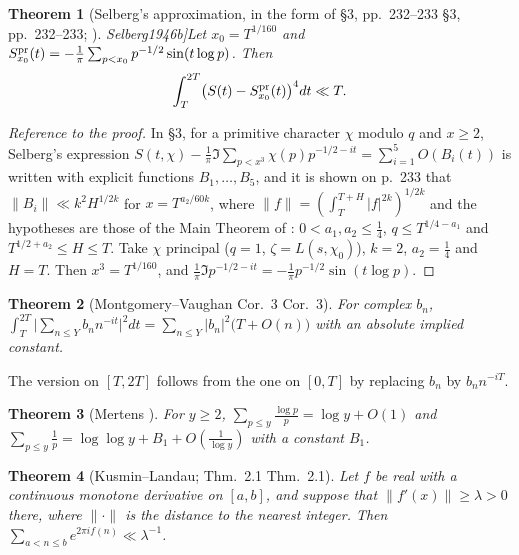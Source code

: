 \documentclass[11pt,reqno]{amsart}
\makeatletter
\let\CG@origcite\cite
\renewcommand*{\cite}[2][]{\def\CG@citekey{#2}%
  \ifx\relax#1\relax\CG@origcite{#2}\else\CG@origcite[#1]{#2}\fi}
\numberwithin{equation}{section}
\theoremstyle{plain}
\newtheorem{theorem}{Theorem}[section]
\theoremstyle{definition}
\theoremstyle{remark}
\makeatother
\begin{document}
\begin{theorem}[Selberg's approximation, in the form of {\cite[\S3, pp.~232--233]{Fujii1974}}; \cite{Selberg1946b}]\label{thm:known_selberg_approx}
Let $x_0=T^{1/160}$ and $S^{\rm pr}_{x_0}(t)=-\frac1\pi\sum_{p<x_0}p^{-1/2}\sin(t\log p)$. Then
\begin{equation}
\int_T^{2T}\bigl(S(t)-S^{\rm pr}_{x_0}(t)\bigr)^4dt\ll T .
\label{eq:selberg_approx}
\end{equation}
\end{theorem}

\begin{proof}[Reference to the proof]
In \cite[\S3]{Fujii1974}, for a primitive character $\chi$ modulo $q$ and $x\ge2$, Selberg's expression $S(t,\chi)-\frac1\pi\Im\sum_{p<x^3}\chi(p)p^{-1/2-it}=\sum_{i=1}^5O(B_i(t))$ is written with explicit functions $B_1,\dots,B_5$, and it is shown on p.~233 that $\|B_i\|\ll k^2H^{1/2k}$ for $x=T^{a_2/60k}$, where $\|f\|=(\int_T^{T+H}|f|^{2k})^{1/2k}$ and the hypotheses are those of the Main Theorem of \cite{Fujii1974}: $0<a_1,a_2\le\frac14$, $q\le T^{1/4-a_1}$ and $T^{1/2+a_2}\le H\le T$. Take $\chi$ principal ($q=1$, $\zeta=L(s,\chi_0)$), $k=2$, $a_2=\frac14$ and $H=T$. Then $x^3=T^{1/160}$, and $\frac1\pi\Im p^{-1/2-it}=-\frac1\pi p^{-1/2}\sin(t\log p)$.
\end{proof}

\begin{theorem}[Montgomery--Vaughan {\cite[Cor.~3]{MontgomeryVaughan1974}}]\label{thm:known_MV}
For complex $b_n$, $\int_T^{2T}\bigl|\sum_{n\le Y}b_nn^{-it}\bigr|^2dt=\sum_{n\le Y}|b_n|^2\bigl(T+O(n)\bigr)$ with an absolute implied constant.
\end{theorem}
The version on $[T,2T]$ follows from the one on $[0,T]$ by replacing $b_n$ by $b_nn^{-iT}$.

\begin{theorem}[Mertens {\cite{Mertens1874}}]\label{thm:known_mertens}
For $y\ge2$, $\sum_{p\le y}\frac{\log p}p=\log y+O(1)$ and $\sum_{p\le y}\frac1p=\log\log y+B_1+O(\frac1{\log y})$ with a constant $B_1$.
\end{theorem}

\begin{theorem}[Kusmin--Landau; {\cite[Thm.~2.1]{GrahamKolesnik1991}}]\label{thm:known_KL}
Let $f$ be real with a continuous monotone derivative on $[a,b]$, and suppose that $\|f'(x)\|\ge\lambda>0$ there, where $\|\cdot\|$ is the distance to the nearest integer. Then $\sum_{a<n\le b}e^{2\pi if(n)}\ll\lambda^{-1}$.
\end{theorem}
\end{document}

